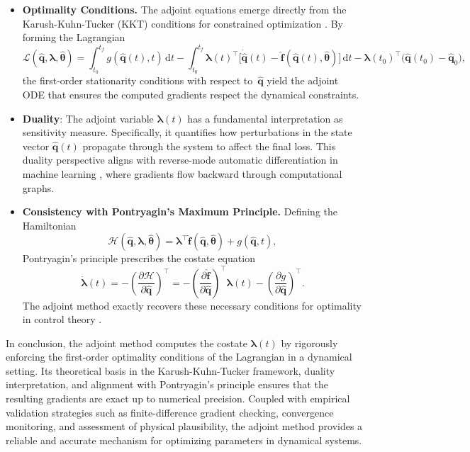 \begin{itemize}
    \item \textbf{Optimality Conditions.}  The adjoint equations emerge directly from the Karush-Kuhn-Tucker (KKT) conditions for constrained optimization \cite{nocedal1999numerical}. By forming the Lagrangian\\
    $$\mathscr{L}(\hat{\mathbf{q}}, \bm{\lambda}, \hat{\bm{\theta}}) 
    = \int_{t_0}^{t_f} g(\hat{\mathbf{q}}(t),t) \,\mathrm{d}t
      - \int_{t_0}^{t_f} \bm{\lambda}(t)^\top \bigl[\dot{\hat{\mathbf{q}}}(t)-\hat{\mathbf{f}}(\hat{\mathbf{q}}(t),\hat{\bm{\theta}})\bigr]\,\mathrm{d}t
      - \bm{\lambda}(t_0)^\top \bigl(\hat{\mathbf{q}}(t_0)-\hat{\mathbf{q}}_0\bigr) ,$$
  the first-order stationarity conditions with respect to~$\hat{\mathbf{q}}$ yield the adjoint ODE that ensures the computed gradients respect the dynamical constraints.
    
    \item \textbf{Duality}: The adjoint variable $\bm{\lambda}(t)$ has a fundamental interpretation as sensitivity measure. Specifically, it quantifies how perturbations in the state vector $\hat{\mathbf{q}}(t)$ propagate through the system to affect the final loss. This duality perspective aligns with reverse-mode automatic differentiation in machine learning \cite{chen2018neural}, where gradients flow backward through computational graphs.

    \item \textbf{Consistency with Pontryagin's Maximum Principle.}  Defining the Hamiltonian\\
  $$\mathcal{H}(\hat{\mathbf{q}}, \bm{\lambda}, \hat{\bm{\theta}}) 
      = \bm{\lambda}^\top \hat{\mathbf{f}}(\hat{\mathbf{q}}, \hat{\bm{\theta}}) 
      + g(\hat{\mathbf{q}}, t),$$
  Pontryagin's principle prescribes the costate equation\\
  $$\dot{\bm{\lambda}}(t) 
      = - \left(\frac{\partial \mathcal{H}}{\partial \hat{\mathbf{q}}} \right)^{\top}
      = - \left(\frac{\partial \hat{\mathbf{f}}}{\partial \hat{\mathbf{q}}} \right)^{\top}\bm{\lambda}(t) -  \left(\frac{\partial g}{\partial \hat{\mathbf{q}}} \right)^{\top}.$$
  The adjoint method exactly recovers these necessary conditions for optimality in control theory \cite{liberzon2011calculus}.
\end{itemize}

In conclusion, the adjoint method computes the costate $\bm{\lambda}(t)$ by rigorously enforcing the first-order optimality conditions of the Lagrangian in a dynamical setting. Its theoretical basis in the Karush-Kuhn-Tucker framework, duality interpretation, and alignment with Pontryagin's principle ensures that the resulting gradients are exact up to numerical precision. Coupled with empirical validation strategies such as finite-difference gradient checking, convergence monitoring, and assessment of physical plausibility, the adjoint method provides a reliable and accurate mechanism for optimizing parameters in dynamical systems.

